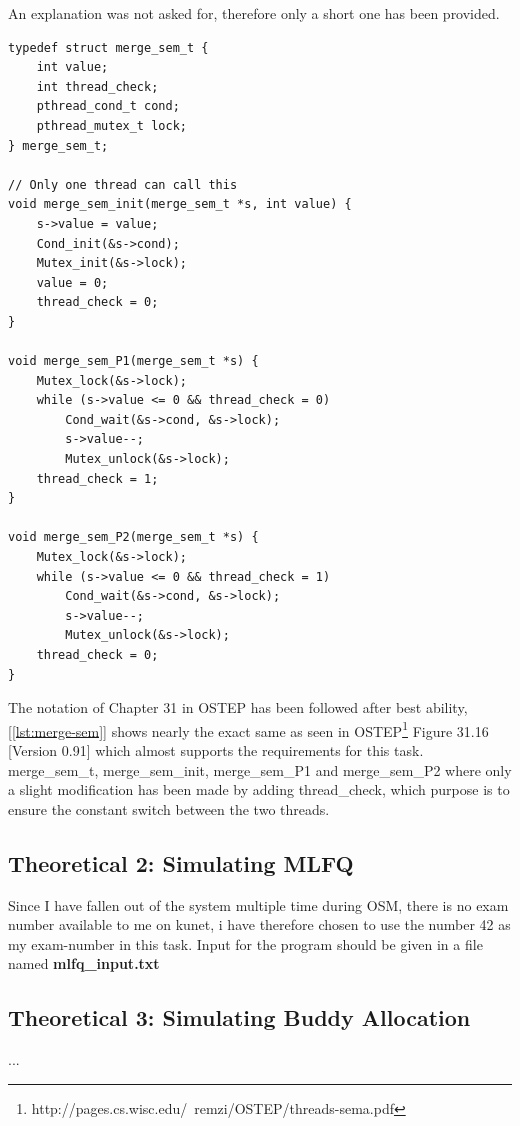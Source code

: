 \documentclass[11pt,a4paper]{article}
\theoremstyle{plain}
\theoremstyle{definition}
\theoremstyle{remark}
\numberwithin{equation}{section}
\begin{document}
An explanation was not asked for, therefore only a short one has been provided.

\begin{lstlisting}[caption={Pseudo Code},label={lst:merge-sem}]
typedef struct merge_sem_t {
    int value;
    int thread_check;
    pthread_cond_t cond;
    pthread_mutex_t lock;
} merge_sem_t;

// Only one thread can call this
void merge_sem_init(merge_sem_t *s, int value) {
    s->value = value;
    Cond_init(&s->cond);
    Mutex_init(&s->lock);
    value = 0;
    thread_check = 0;
}

void merge_sem_P1(merge_sem_t *s) {
    Mutex_lock(&s->lock);
    while (s->value <= 0 && thread_check = 0)
        Cond_wait(&s->cond, &s->lock);
        s->value--;
        Mutex_unlock(&s->lock);
    thread_check = 1;
}

void merge_sem_P2(merge_sem_t *s) {
    Mutex_lock(&s->lock);
    while (s->value <= 0 && thread_check = 1)
        Cond_wait(&s->cond, &s->lock);
        s->value--;
        Mutex_unlock(&s->lock);
    thread_check = 0;
}
\end{lstlisting}

The notation of Chapter 31 in OSTEP has been followed after best ability, [\ref{lst:merge-sem}] shows nearly the exact same as seen in OSTEP\footnote{http://pages.cs.wisc.edu/~remzi/OSTEP/threads-sema.pdf} Figure 31.16 [Version 0.91] which almost supports the requirements for this task. merge\_sem\_t, merge\_sem\_init, merge\_sem\_P1 and merge\_sem\_P2 where only a slight modification has been made by adding thread\_check, which purpose is to ensure the constant switch between the two threads.


\subsection*{Theoretical 2: Simulating MLFQ}


Since I have fallen out of the system multiple time during OSM, there is no exam number available to me on kunet, i have therefore chosen to use the number 42 as my exam-number in this task. Input for the program should be given in a file named \textbf{mlfq\_input.txt}

\subsection*{Theoretical 3: Simulating Buddy Allocation}

...
\end{document}

